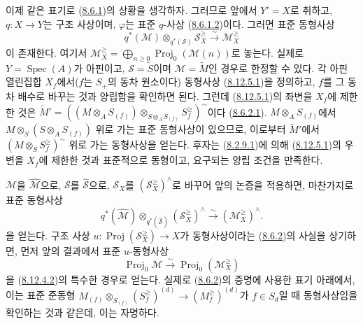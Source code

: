 \begin{env}[8.12.5]
\label{II.8.12.5-ko}
이제 같은 표기로 (\hyperref[II.8.6.1-ko]{8.6.1})의 상황을 생각하자.
그러므로 앞에서 $Y'=X$로 취하고, $q:X\to Y$는 구조 사상이며,
$\varphi$는 표준 $q$-사상
(\hyperref[II.8.6.1.2-ko]{8.6.1.2})이다. 그러면 표준 동형사상
\begin{equation}
\label{II.8.12.5.1-ko}
  q^*(\mathcal{M})\otimes_{q^*(\mathcal{S})}\mathcal{S}_X^{\geq}
  \xrightarrow{\sim}\mathcal{M}_X^{\geq}
\tag{8.12.5.1}
\end{equation}
이 존재한다. 여기서
$\mathcal{M}_X^{\geq}=\bigoplus_{n\geq0}\operatorname{Proj}_0(\mathcal{M}(n))$로
놓는다. 실제로 $Y=\operatorname{Spec}(A)$가 아핀이고,
$\mathcal{S}=\widetilde{S}$이며 $\mathcal{M}=\widetilde{M}$인 경우로
한정할 수 있다. 각 아핀 열린집합 $X_f$에서($f$는 $S_+$의 동차
원소이다) 동형사상 (\hyperref[II.8.12.5.1-ko]{8.12.5.1})을 정의하고,
$f$를 그 동차 배수로 바꾸는 것과 양립함을 확인하면 된다. 그런데
(\hyperref[II.8.12.5.1-ko]{8.12.5.1})의 좌변을 $X_f$에 제한한 것은
$\widetilde{M}'=
\left((M\otimes_A S_{(f)})
\otimes_{S\otimes_A S_{(f)}}S_f^{\geq}\right)^{\sim}$이다
(\hyperref[II.8.6.2.1-ko]{8.6.2.1}).
$M\otimes_A S_{(f)}$에서
$M\otimes_S(S\otimes_A S_{(f)})$ 위로 가는 표준 동형사상이 있으므로,
이로부터 $\widetilde{M}'$에서
$\left(M\otimes_S S_f^{\geq}\right)^{\sim}$ 위로 가는 동형사상을
얻는다. 후자는 (\hyperref[II.8.2.9.1-ko]{8.2.9.1})에 의해
(\hyperref[II.8.12.5.1-ko]{8.12.5.1})의 우변을 $X_f$에 제한한 것과
표준적으로 동형이고, 요구되는 양립 조건을 만족한다.

$\mathcal{M}$을 $\widehat{\mathcal{M}}$으로, $\mathcal{S}$를
$\widehat{\mathcal{S}}$으로, $\mathcal{S}_X$를
$(\mathcal{S}_X^{\geq})^{\wedge}$로 바꾸어 앞의 논증을 적용하면,
마찬가지로 표준 동형사상
\begin{equation}
\label{II.8.12.5.2-ko}
  q^*(\widehat{\mathcal{M}})
  \otimes_{q^*(\widehat{\mathcal{S}})}(\mathcal{S}_X^{\geq})^{\wedge}
  \xrightarrow{\sim}(\mathcal{M}_X^{\geq})^{\wedge}.
\tag{8.12.5.2}
\end{equation}
을 얻는다. 구조 사상
$u:\operatorname{Proj}(\mathcal{S}_X^{\geq})\to X$가 동형사상이라는
(\hyperref[II.8.6.2-ko]{8.6.2})의 사실을 상기하면, 먼저 앞의 결과에서
표준 $u$-동형사상
\begin{equation}
\label{II.8.12.5.3-ko}
  \operatorname{Proj}_0\mathcal{M}
  \xrightarrow{\sim}\operatorname{Proj}_0(\mathcal{M}_X^{\geq})
\tag{8.12.5.3}
\end{equation}
을 (\hyperref[II.8.12.4.2-ko]{8.12.4.2})의 특수한 경우로 얻는다.
실제로 (\hyperref[II.8.6.2-ko]{8.6.2})의 증명에 사용한 표기 아래에서,
이는 표준 준동형
$M_{(f)}\otimes_{S_{(f)}}(S_f^{\geq})^{(d)}\to(M_f^{\geq})^{(d)}$가
$f\in S_d$일 때
동형사상임을 확인하는 것과 같은데, 이는 자명하다.


\end{env}
